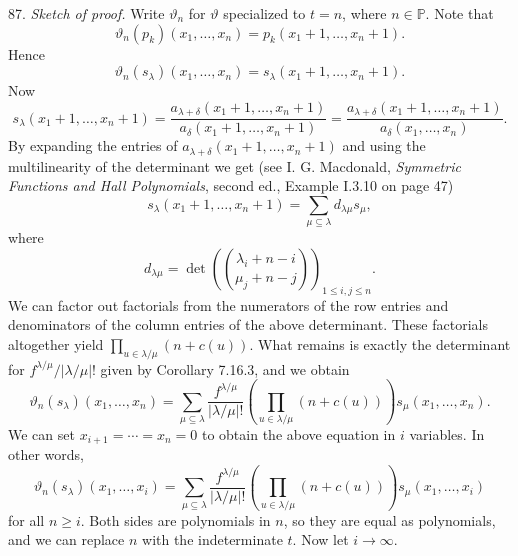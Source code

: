 87. \textit{Sketch of proof.} Write $\vartheta_n$ for $\vartheta$ specialized to $t=n$, where $n\in\mathbb{P}$. Note that
\[
\vartheta_n(p_k)(x_1,\ldots,x_n)=p_k(x_1+1,\ldots,x_n+1).
\]
Hence
\[
\vartheta_n(s_\lambda)(x_1,\ldots,x_n)=s_\lambda(x_1+1,\ldots,x_n+1).
\]
Now
\[
s_\lambda(x_1+1,\ldots,x_n+1)=\frac{a_{\lambda+\delta}(x_1+1,\ldots,x_n+1)}{a_\delta(x_1+1,\ldots,x_n+1)}=\frac{a_{\lambda+\delta}(x_1+1,\ldots,x_n+1)}{a_\delta(x_1,\ldots,x_n)}.
\]
By expanding the entries of $a_{\lambda+\delta}(x_1+1,\ldots,x_n+1)$ and using the multilinearity of the determinant we get (see I. G. Macdonald, \textit{Symmetric Functions and Hall Polynomials}, second ed., Example I.3.10 on page 47)
\[
s_\lambda(x_1+1,\ldots,x_n+1)=\sum_{\mu\subseteq\lambda}d_{\lambda\mu}s_\mu,\tag{27}
\]
where
\[
d_{\lambda\mu}=\det\left(\binom{\lambda_i+n-i}{\mu_j+n-j}\right)_{1\le i,j\le n}.
\]
We can factor out factorials from the numerators of the row entries and denominators of the column entries of the above determinant. These factorials altogether yield $\prod_{u\in\lambda/\mu}(n+c(u))$. What remains is exactly the determinant for $f^{\lambda/\mu}/|\lambda/\mu|!$ given by Corollary 7.16.3, and we obtain
\[
\vartheta_n(s_\lambda)(x_1,\ldots,x_n)=\sum_{\mu\subseteq\lambda}\frac{f^{\lambda/\mu}}{|\lambda/\mu|!}\left(\prod_{u\in\lambda/\mu}(n+c(u))\right)s_\mu(x_1,\ldots,x_n).
\]
We can set $x_{i+1}=\cdots=x_n=0$ to obtain the above equation in $i$ variables. In other words,
\[
\vartheta_n(s_\lambda)(x_1,\ldots,x_i)=\sum_{\mu\subseteq\lambda}\frac{f^{\lambda/\mu}}{|\lambda/\mu|!}\left(\prod_{u\in\lambda/\mu}(n+c(u))\right)s_\mu(x_1,\ldots,x_i)
\]
for all $n\ge i$. Both sides are polynomials in $n$, so they are equal as polynomials, and we can replace $n$ with the indeterminate $t$. Now let $i\to\infty$.
